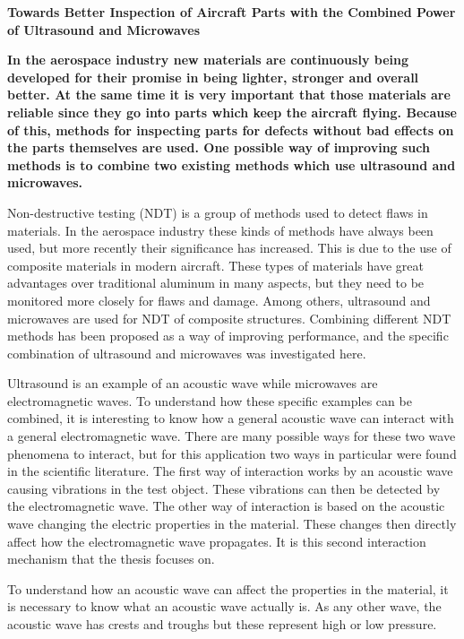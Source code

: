 \documentclass[11pt]{article}
\begin{document}
	
	\begingroup
		\centering
		\LARGE \textbf{Towards Better Inspection of Aircraft Parts with the Combined Power of Ultrasound and Microwaves} \par
		\vspace{1.0cm}
	\endgroup
	
	\noindent
	\textbf{
		In the aerospace industry new materials are continuously being developed for their promise in being lighter, stronger and overall better. At the same time it is very important that those materials are reliable since they go into parts which keep the aircraft flying. Because of this, methods for inspecting parts for defects without bad effects on the parts themselves are used. One possible way of improving such methods is to combine two existing methods which use ultrasound and microwaves.
	}
	\begin{multicols}{2}		
		\noindent
		Non-destructive testing (NDT) is a group of methods used to detect flaws in materials. In the aerospace industry these kinds of methods have always been used, but more recently their significance has increased. This is due to the use of composite materials in modern aircraft. These types of materials have great advantages over traditional aluminum in many aspects, but they need to be monitored more closely for flaws and damage. Among others, ultrasound and microwaves are used for NDT of composite structures. Combining different NDT methods has been proposed as a way of improving performance, and the specific combination of ultrasound and microwaves was investigated here.
		
		Ultrasound is an example of an acoustic wave while microwaves are electromagnetic waves. To understand how these specific examples can be combined, it is interesting to know how a general acoustic wave can interact with a general electromagnetic wave. There are many possible ways for these two wave phenomena to interact, but for this application two ways in particular were found in the scientific literature. The first way of interaction works by an acoustic wave causing vibrations in the test object. These vibrations can then be detected by the electromagnetic wave. The other way of interaction is based on the acoustic wave changing the electric properties in the material. These changes then directly affect how the electromagnetic wave propagates. It is this second interaction mechanism that the thesis focuses on.
		
		To understand how an acoustic wave can affect the properties in the material, it is necessary to know what an acoustic wave actually is. As any other wave, the acoustic wave has crests and troughs but these represent high or low pressure. 
		
	\end{multicols}
	
\end{document}
